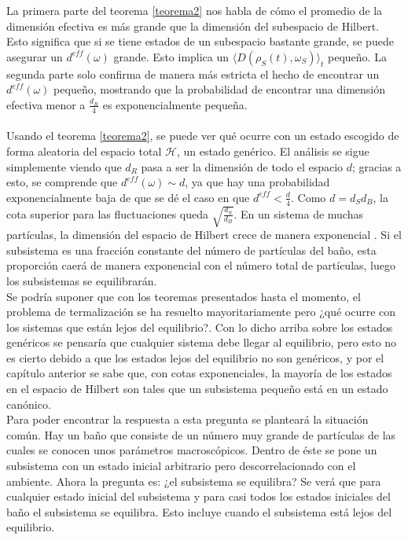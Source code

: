 La primera parte del teorema \ref{teorema2} nos habla de cómo el promedio de la dimensión efectiva es más grande que la dimensión del subespacio de Hilbert. Esto significa que si se tiene estados de un subespacio bastante grande, se puede asegurar un $d^{eff}(\omega)$ grande. Esto implica un $\langle D(\rho_{S}(t) ,\omega_{S}) \rangle_{t}$ pequeño. La segunda parte solo confirma de manera más estricta el hecho de encontrar un $d^{eff}(\omega)$ pequeño, mostrando que la probabilidad de encontrar una dimensión efectiva menor a $\frac{d_{R}}{4}$ es exponencialmente pequeña.\\
\\
Usando el teorema \ref{teorema2}, se puede ver qué ocurre con un estado escogido de forma aleatoria del espacio total $\mathcal{H}$, un estado genérico. El análisis se sigue simplemente viendo que $d_{R}$ pasa a ser la dimensión de todo el espacio $d$; gracias a esto, se comprende que $d^{eff}(\omega) \sim d$, ya que hay una probabilidad exponencialmente baja de que se dé el caso en que $d^{eff} < \frac{d}{4}$. Como $d=d_{S}d_{B}$, la cota superior para las fluctuaciones queda $\sqrt{\frac{d_{S}}{d_{B}}}$. En un sistema de muchas partículas, la dimensión del espacio de Hilbert crece de manera exponencial \cite{TodaStat}. Si el subsistema es una fracción constante del número de partículas del baño, esta proporción caerá de manera exponencial con el número total de partículas, luego los subsistemas se equilibrarán.
\\
Se podría suponer que con los teoremas presentados hasta el momento, el problema de termalización se ha resuelto mayoritariamente pero ¿qué ocurre con los sistemas que están lejos del equilibrio?. Con lo dicho arriba sobre los estados genéricos se pensaría que cualquier sistema debe llegar al equilibrio, pero esto no es cierto debido a que los estados lejos del equilibrio no son genéricos, y por el capítulo anterior se sabe que, con cotas exponenciales, la mayoría de los estados en el espacio de Hilbert son tales que un subsistema pequeño está en un estado canónico.
\\
Para poder encontrar la respuesta a esta pregunta se planteará la situación común. Hay un baño que consiste de un número muy grande de partículas de las cuales se conocen unos parámetros macroscópicos. Dentro de éste se pone un subsistema con un estado inicial arbitrario pero descorrelacionado con el ambiente. Ahora la pregunta es: ¿el subsistema se equilibra? Se verá que para cualquier estado inicial del subsistema y para casi todos los estados iniciales del baño el subsistema se equilibra. Esto incluye cuando el subsistema está lejos del equilibrio.
